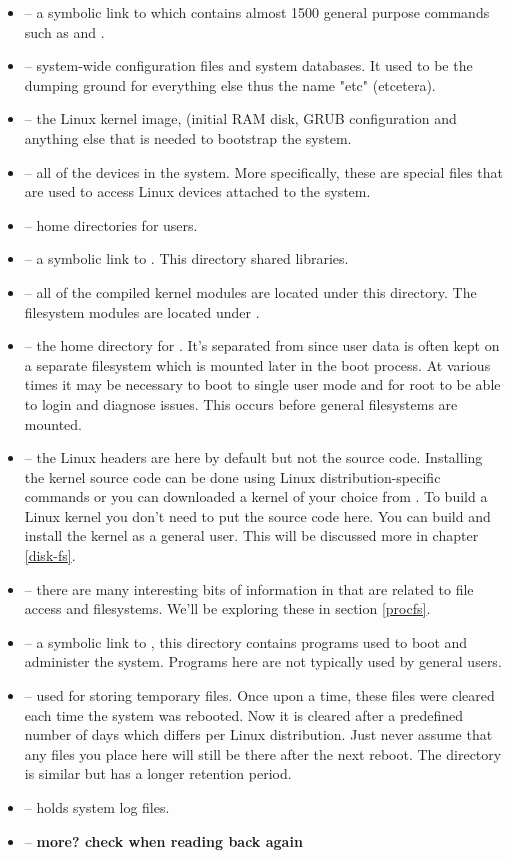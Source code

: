 \begin{itemize}
	\item {} -- a symbolic link to  which contains almost 1500 general purpose commands such as  
		and .
	\item {} -- system-wide configuration files and system databases. It used to be the dumping ground for 
		everything else thus the name "etc" (etcetera). 
	\item {} -- the Linux kernel image,  (initial RAM disk, GRUB configuration and anything else that
		is needed to bootstrap the system.
	\item {} -- all of the devices in the system. More specifically, these are special files that are used to access
		Linux devices attached to the system. 
	\item {} -- home directories for users.
	\item {} -- a symbolic link to . This directory shared libraries.
	\item {} -- all of the compiled kernel modules are located under this directory. The filesystem modules 
		are located under .
	\item {} -- the home directory for . It's separated from  since user data is often kept on a 
		separate filesystem which is mounted later in the boot process. At various times it may be necessary to boot
		to single user mode and for root to be able to login and diagnose issues. This occurs before general filesystems
		are mounted.
	\item {} -- the Linux headers are here by default but not the source code. Installing the kernel
		source code can be done using Linux distribution-specific commands or you can downloaded a kernel
		of your choice from .  To build a Linux kernel you don't need to put the source code here. You
		can build and install the kernel as a general user. This will be discussed more in chapter \ref{disk-fs}.
	\item {} -- there are many interesting bits of information in  that are related to
		file access and filesystems. We'll be exploring these in section \ref{procfs}.
	\item {} -- a symbolic link to , this directory contains programs used to boot and administer the 
		system. Programs here are not typically used by general users.
	\item {} -- used for storing temporary files. Once upon a time, these files were cleared each time the system
		was rebooted. Now it is cleared after a predefined number of days which differs per Linux distribution. Just never 
		assume that any files you place here will still be there after the next reboot. The  directory is
		similar but has a longer retention period.
	\item {} -- holds system log files.
	\item {} -- \textbf{more? check when reading back again}
\end{itemize}

